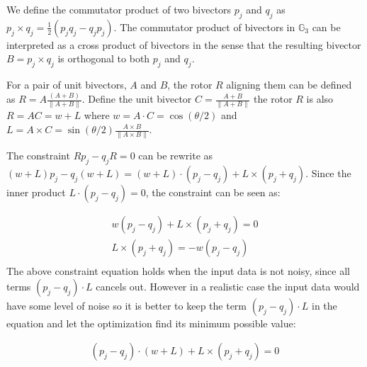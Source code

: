 \documentclass{birkjour}
\numberwithin{equation}{section}
\begin{document}
We define the commutator product of two bivectors $p_j$ and $q_j$ as $p_j \times q_j = \frac{1}{2}(p_j q_j - q_j p _j)$. The commutator product of bivectors in $\mathbb{G}_3$  can be interpreted as a cross product of bivectors in the sense that the resulting bivector $B = p_j \times q_j$ is orthogonal to both $p_j$ and $q_j$.

For a pair of unit bivectors, $A$ and $B$, the rotor $R$ aligning them can be defined as $R = A \frac{(A + B)}{\|A + B\|}$. Define the unit bivector $C = \frac{A + B}{\|A + B\|}$ the rotor $R$ is also $R = A C = w + L$ where $w = A \cdot C = \cos(\theta/2)$ and $L = A \times C = \sin(\theta/2) \frac{A \times B}{\|A \times B\|}$.

The constraint $R p_j - q_j R = 0$ can be rewrite as $(w + L) p_j - q_j (w + L) = (w + L) \cdot (p_j - q_j) + L \times (p_j + q_j)$. Since the inner product $L \cdot (p_j - q_j) = 0$, the constraint can be seen as:

\begin{eqnarray*}
w (p_j - q_j) +  L \times (p_j + q_j)  = 0\\
L \times (p_j + q_j) = -w (p_j - q_j)\\
\end{eqnarray*}
The above constraint equation holds when the input data is not noisy, since all terms $(p_j - q_j) \cdot L$ cancels out. However in a realistic case the input data would have some level of noise so it is better to keep the term $(p_j - q_j) \cdot L$ in the equation and let the optimization find its minimum possible value:

\begin{eqnarray*}
(p_j - q_j) \cdot (w + L) + L \times (p_j + q_j) = 0\\
\end{eqnarray*}
\end{document}
